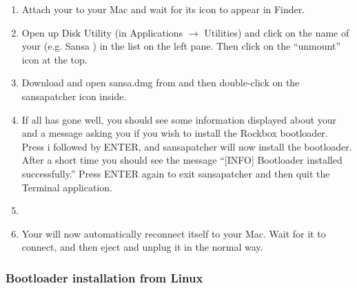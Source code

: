 \begin{enumerate}

\item Attach your \dap{} to your Mac and wait for its icon to appear in 
Finder.

\item\label{subsec:macos_umount} Open up Disk Utility
(in Applications $\rightarrow$ Utilities) and click 
on the name of your \dap{} (e.g. Sansa )
in the list on the left pane. Then click on the ``unmount'' icon at the top.

\item Download and open sansa.dmg from 
and then double-click on the sansapatcher icon inside. 

\item If all has gone well, you should see some
information displayed about your \dap{} and a message asking you if you 
wish to install the Rockbox bootloader. Press i followed by ENTER, and 
sansapatcher will now install the bootloader. After a short time you 
should see the message ``[INFO] Bootloader installed successfully.'' Press 
ENTER again to exit sansapatcher and then quit the Terminal application.

\item {}

\item Your \dap{} will now automatically reconnect itself to your Mac. 
Wait for it to connect, and then eject and unplug it in the normal way. 

\end{enumerate}

\subsubsection{Bootloader installation from Linux}

